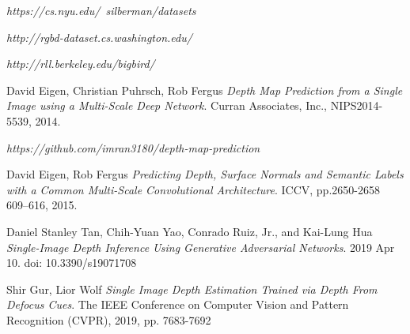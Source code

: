 \documentclass{article}
\begin{document}
\medskip
\small
\begin{thebibliography}{8}

\textit{https://cs.nyu.edu/~silberman/datasets}

\textit{http://rgbd-dataset.cs.washington.edu/}

\textit{http://rll.berkeley.edu/bigbird/}
 
David Eigen, Christian Puhrsch, Rob Fergus
\textit{Depth Map Prediction from a Single Image using a Multi-Scale Deep Network}.
Curran Associates, Inc., NIPS2014-5539, 2014.
 
\textit{https://github.com/imran3180/depth-map-prediction}

David Eigen, Rob Fergus
\textit{Predicting Depth, Surface Normals and Semantic Labels with a Common Multi-Scale Convolutional Architecture}. 
ICCV, pp.2650-2658 609--616, 2015.

Daniel Stanley Tan, Chih-Yuan Yao, Conrado Ruiz, Jr., and Kai-Lung Hua
\textit{Single-Image Depth Inference Using Generative Adversarial Networks}.
2019 Apr 10. doi: 10.3390/s19071708

Shir Gur, Lior Wolf
\textit{Single Image Depth Estimation Trained via Depth From Defocus Cues}.
The IEEE Conference on Computer Vision and Pattern Recognition (CVPR), 2019, pp. 7683-7692


\end{thebibliography}
\end{document}
